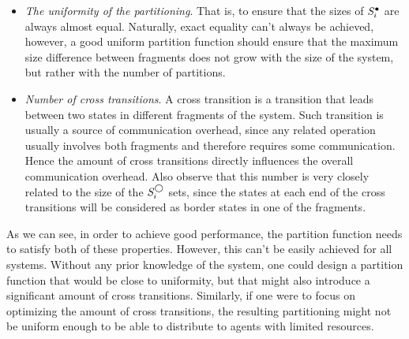 \begin{itemize}
	\item  \emph{The uniformity of the partitioning}. That is, to ensure that the sizes of $\mathit{S}^\bullet_i$ are always almost equal. Naturally, exact equality can't always be achieved, however, a good uniform partition function should ensure that the maximum size difference between fragments does not grow with the size of the system, but rather with the number of partitions.
	\item \emph{Number of cross transitions}. A cross transition is a transition that leads between two states in different fragments of the system. Such transition is usually a source of communication overhead, since any related operation usually involves both fragments and therefore requires some communication. Hence the amount of cross transitions directly influences the overall communication overhead. Also observe that this number is very closely related to the size of the $\mathit{S}^\bigcirc_i$ sets, since the states at each end of the cross transitions will be considered as border states in one of the fragments.
\end{itemize}

As we can see, in order to achieve good performance, the partition function needs to satisfy both of these properties. However, this can't be easily achieved for all systems. Without any prior knowledge of the system, one could design a partition function that would be close to uniformity, but that might also introduce a significant amount of cross transitions. Similarly, if one were to focus on optimizing the amount of cross transitions, the resulting partitioning might not be uniform enough to be able to distribute to agents with limited resources.

